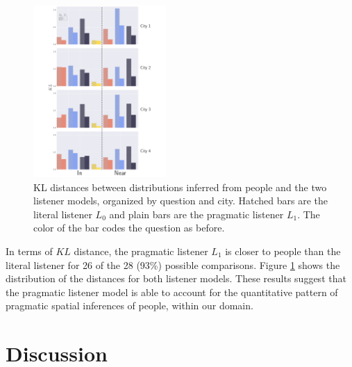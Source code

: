 \documentclass[10pt,letterpaper]{article}
\begin{document}
\begin{figure}[!t]
\center
\includegraphics[width=0.45\textwidth]{figures/KL.pdf}
\caption{KL distances between distributions inferred from people and the two listener models, organized by question and city. Hatched bars are the literal listener $L_0$ and plain bars are the pragmatic listener $L_1$. The color of the bar codes the question as before.}
\label{fig:KL}
\end{figure}

In terms of $KL$ distance, the pragmatic listener $L_1$ is closer to people than the literal listener for 26 of the 28 (93\%) possible comparisons. Figure \ref{fig:KL} shows the distribution of the distances for both listener models. These results suggest that the pragmatic listener model is able to account for the quantitative pattern of pragmatic spatial inferences of people, within our domain.  

\section{Discussion}






\setlength{\bibleftmargin}{.125in}
\setlength{\bibindent}{-\bibleftmargin}

\end{document}
